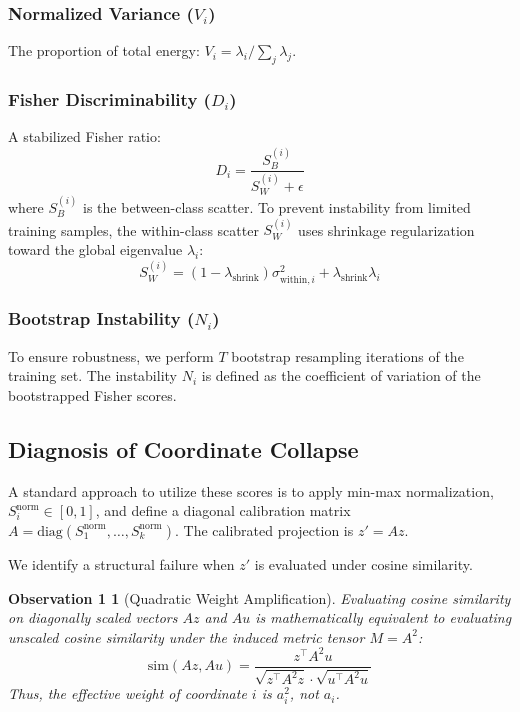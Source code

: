 \documentclass[conference]{IEEEtran}
\begin{document}
\subsubsection{Normalized Variance ($V_i$)} 
The proportion of total energy: $V_i = \lambda_i / \sum_j \lambda_j$.

\subsubsection{Fisher Discriminability ($D_i$)} 
A stabilized Fisher ratio:
\begin{equation}
    D_i = \frac{S_B^{(i)}}{S_W^{(i)} + \epsilon}
\end{equation}
where $S_B^{(i)}$ is the between-class scatter. To prevent instability from limited training samples, the within-class scatter $S_W^{(i)}$ uses shrinkage regularization toward the global eigenvalue $\lambda_i$:
\begin{equation}
    S_W^{(i)} = (1 - \lambda_{\text{shrink}}) \sigma_{\text{within}, i}^2 + \lambda_{\text{shrink}} \lambda_i
\end{equation}

\subsubsection{Bootstrap Instability ($N_i$)} 
To ensure robustness, we perform $T$ bootstrap resampling iterations of the training set. The instability $N_i$ is defined as the coefficient of variation of the bootstrapped Fisher scores.

\subsection{Diagnosis of Coordinate Collapse}
\label{sec:collapse_theory}

A standard approach to utilize these scores is to apply min-max normalization, $S_i^{\text{norm}} \in [0, 1]$, and define a diagonal calibration matrix $A = \text{diag}(S_1^{\text{norm}}, \ldots, S_k^{\text{norm}})$. The calibrated projection is $z' = Az$.

We identify a structural failure when $z'$ is evaluated under cosine similarity.

\newtheorem*{observation}{Observation 1}
\begin{observation}[Quadratic Weight Amplification]
Evaluating cosine similarity on diagonally scaled vectors $Az$ and $Au$ is mathematically equivalent to evaluating unscaled cosine similarity under the induced metric tensor $M = A^2$:
\begin{equation}
    \text{sim}(Az, Au) = \frac{z^\top A^2 u}{\sqrt{z^\top A^2 z} \cdot \sqrt{u^\top A^2 u}}
\end{equation}
Thus, the effective weight of coordinate $i$ is $a_i^2$, not $a_i$.
\end{observation}
\end{document}
